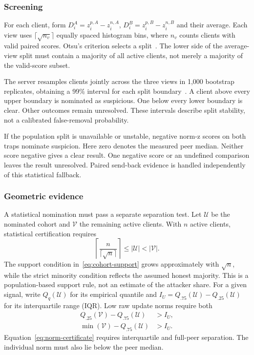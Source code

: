\documentclass[journal]{IEEEtran}
\begin{document}
\subsubsection{Screening}
For each client, form $D_i^A=z_i^{p,A}-z_i^{n,A}$,
$D_i^B=z_i^{p,B}-z_i^{n,B}$ and their average. Each view uses
$\lceil\sqrt{n_v}\rceil$ equally spaced histogram bins, where $n_v$ counts
clients with valid paired scores. Otsu's criterion selects a
split~\cite{otsu1979threshold}. The lower side of the average-view split
must contain a majority of all active clients, not merely a majority of
the valid-score subset.

The server resamples clients jointly across the three views in 1,000
bootstrap replicates, obtaining a 99\% interval for each split
boundary~\cite{efron1979bootstrap}. A client above every upper boundary
is nominated as suspicious. One below every lower boundary is clear.
Other outcomes remain unresolved. These intervals describe split
stability, not a calibrated false-removal probability.

If the population split is unavailable or unstable, negative norm-z scores
on both traps nominate suspicion. Here zero denotes the measured peer
median. Neither score negative gives a clear result. One negative score
or an undefined comparison leaves the result unresolved. Paired send-back evidence is handled
independently of this statistical fallback.

\subsubsection{Geometric evidence}
A statistical nomination must pass a separate separation test. Let
$\mathcal U$ be the nominated cohort and $\mathcal V$ the remaining active
clients. With $n$ active clients, statistical certification requires
\begin{equation}\label{eq:cohort-support}
 \left\lceil\frac{n}{\lceil\sqrt n\rceil}\right\rceil
       \leq|\mathcal U|<|\mathcal V|.
\end{equation}
The support condition in~\eqref{eq:cohort-support} grows approximately with $\sqrt n$, while the strict
minority condition reflects the assumed honest majority. This is a
population-based support rule, not an estimate of the attacker share.
For a given signal, write $Q_q(\mathcal U)$ for its empirical quantile
and $I_U=Q_{.75}(\mathcal U)-Q_{.25}(\mathcal U)$ for its interquartile
range (IQR). Low raw update norms require both
\begin{align}\label{eq:norm-certificate}
 Q_{.25}(\mathcal V)-Q_{.75}(\mathcal U)&>I_U,\\
 \min(\mathcal V)-Q_{.75}(\mathcal U)&>I_U.\nonumber
\end{align}
Equation~\eqref{eq:norm-certificate} requires interquartile and full-peer separation. The individual norm must also lie below the peer median.
\end{document}
